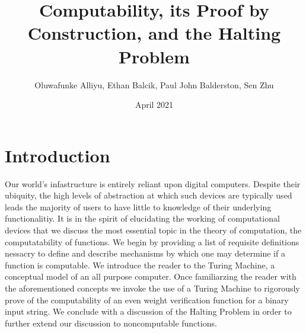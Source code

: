\documentclass{article}
\title{Computability, its Proof by Construction, and the Halting Problem}
\author{Oluwafunke Alliyu, Ethan Balcik, Paul John Balderston, Sen Zhu}
\date{April 2021}
\begin{document}
\theoremstyle{definition}
\newtheorem{exmp}{Example}[section]
\newtheorem{defin}{Definition}[section]
\newtheorem{prf}{Proof}[section]

\maketitle

\section{Introduction}
Our world’s infastructure is entirely reliant upon digital computers. Despite
their ubiquity, the high levels of abstraction at which such devices are typically
used leads the majority of users to have little to knowledge of their underlying
functionalitiy. It is in the spirit of elucidating the working of computational
devices that we discuss the most essential topic in the theory of computation, the
computatability of functions. We begin by providing a list of requisite definitions
nessacry to define and describe mechanisms by which one may determine if a
function is computable. We introduce the reader to the Turing Machine, a
conceptual model of an all purpose computer. Once familiarzing the reader
with the aforementioned concepts we invoke the use of a Turing Machine to
rigorously prove of the computability of an even weight verification function for
a binary input string. We conclude with a discussion of the Halting Problem in
order to further extend our discussion to noncomputable functions. \cite{1}
\end{document}
